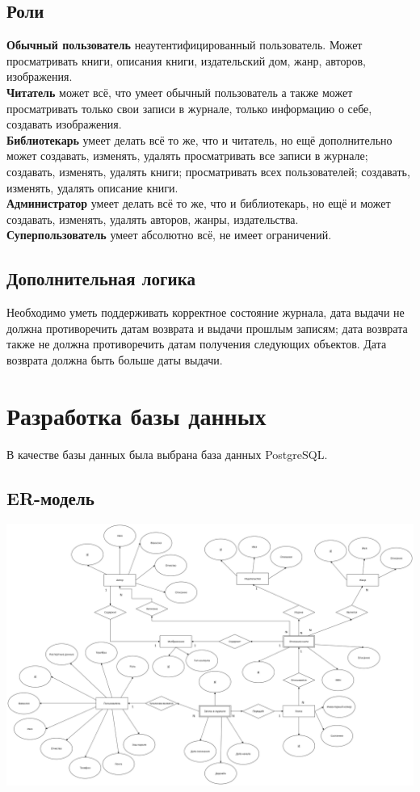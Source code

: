 \documentclass[a4paper,14pt]{extarticle}
\begin{document}
\subsection{Роли}
\textbf{Обычный пользователь} неаутентифицированный пользователь. 
Может просматривать книги, описания книги, издательский 
дом, жанр, авторов, изображения.\\
\textbf{Читатель} может всё, что умеет обычный пользователь а также может 
просматривать только свои записи в журнале, только информацию о себе, 
создавать изображения. \\
\textbf{Библиотекарь} умеет делать всё то же, что и читатель, но ещё дополнительно может
создавать, изменять, удалять просматривать все записи в журнале; создавать, изменять, удалять книги; 
просматривать всех пользователей; создавать, изменять, удалять описание книги. \\
\textbf{Администратор} умеет делать всё то же, что и библиотекарь, но ещё и может создавать, 
изменять, удалять авторов, жанры, издательства.\\
\textbf{Суперпользователь} умеет абсолютно всё, не имеет ограничений.\\

\subsection{Дополнительная логика}
Необходимо уметь поддерживать корректное состояние журнала, дата выдачи не должна противоречить
датам возврата и выдачи прошлым записям; дата возврата также не должна противоречить датам 
получения следующих объектов. Дата возврата должна быть больше даты выдачи.

\section{Разработка базы данных}
В качестве базы данных была выбрана база данных PostgreSQL. 
\subsection{ER-модель}
\includegraphics[width=140mm]{er.png}
\end{document}
